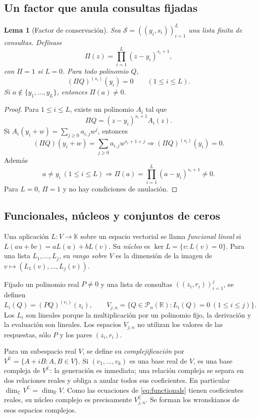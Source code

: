 \documentclass[11pt,a4paper]{article}
\numberwithin{equation}{section}
\newtheorem{lemma}[theorem]{Lema}
\theoremstyle{definition}
\theoremstyle{remark}
\newcommand{\R}{\mathbb R}
\newcommand{\C}{\mathbb C}
\newcommand{\PP}{\mathcal P}
\begin{document}
\subsection{Un factor que anula consultas fijadas}
\begin{lemma}[Factor de conservación]\label{lem:oldfactor}
Sea $\mathcal S=((y_i,s_i))_{i=1}^L$ una lista finita de consultas. Defínase
\[
\Pi(z)=\prod_{i=1}^L(z-y_i)^{s_i+1},
\]
con $\Pi=1$ si $L=0$. Para todo polinomio $Q$,
\[
(\Pi Q)^{(s_i)}(y_i)=0\qquad(1\le i\le L).
\]
Si $a\notin\{y_1,\ldots,y_L\}$, entonces $\Pi(a)\ne0$.
\end{lemma}
\begin{proof}
Para $1\le i\le L$, existe un polinomio $A_i$ tal que
\[
\Pi Q=(z-y_i)^{s_i+1}A_i(z).
\]
Si $A_i(y_i+w)=\sum_{j\ge0}a_{i,j}w^j$, entonces
\[
(\Pi Q)(y_i+w)=\sum_{j\ge0}a_{i,j}w^{s_i+1+j}
\Longrightarrow (\Pi Q)^{(s_i)}(y_i)=0.
\]
Además
\[
a\ne y_i\ (1\le i\le L)\Longrightarrow
\Pi(a)=\prod_{i=1}^L(a-y_i)^{s_i+1}\ne0.
\]
Para $L=0$, $\Pi=1$ y no hay condiciones de anulación.
\end{proof}

\subsection{Funcionales, núcleos y conjuntos de ceros}
Una aplicación $L:V\to\mathbb K$ sobre un espacio vectorial se llama \emph{funcional lineal} si $L(au+bv)=aL(u)+bL(v)$. Su \emph{núcleo} es $\ker L=\{v:L(v)=0\}$. Para una lista $L_1,\ldots,L_j$, su \emph{rango sobre $V$} es la dimensión de la imagen de $v\mapsto(L_1(v),\ldots,L_j(v))$.

Fijado un polinomio real $P\ne0$ y una lista de consultas $((z_i,r_i))_{i=1}^j$, se definen
\begin{equation}\label{eq:functionals}
L_i(Q)=(PQ)^{(r_i)}(z_i),\qquad
V_{j,n}=\{Q\in\PP_n(\R):L_i(Q)=0\ (1\le i\le j)\}.
\end{equation}
Los $L_i$ son lineales porque la multiplicación por un polinomio fijo, la derivación y la evaluación son lineales. Los espacios $V_{j,n}$ no utilizan los valores de las respuestas, sólo $P$ y los pares $(z_i,r_i)$.

Para un subespacio real $V$, se define su \emph{complejificación} por $V^{\C}=\{A+iB:A,B\in V\}$. Si $(v_1,\ldots,v_k)$ es una base real de $V$, es una base compleja de $V^{\C}$: la generación es inmediata; una relación compleja se separa en dos relaciones reales y obliga a anular todos sus coeficientes. En particular $\dim_\C V^{\C}=\dim_\R V$. Como las ecuaciones de \eqref{eq:functionals} tienen coeficientes reales, su núcleo complejo es precisamente $V_{j,n}^{\C}$. Se forman los wronskianos de esos espacios complejos.
\end{document}
